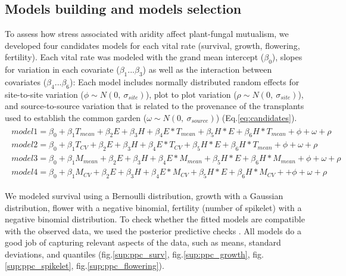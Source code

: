 \documentclass[11pt]{article}
\begin{document}
\subsection*{Models building and models selection}
To assess how stress associated with aridity  affect plant-fungal mutualism, we developed four candidates models for each vital rate (survival, growth, flowering, fertility). 
Each vital rate was modeled with  the  grand mean intercept ($\beta_{0}$), slopes for  variation in each covariate ($\beta_{1}$...$\beta_{3}$) as well as the interaction between covariates ($\beta_{4}$...$\beta_{6}$): 
Each model includes normally distributed random effects for site-to-site  variation ($\phi \sim N(0,\ \sigma_{site})$), plot to plot variation ($\rho \sim N(0,\ \sigma_{site})$), and source-to-source variation that is related to the  provenance of the transplants used to establish the common garden ($\omega \sim N(0,\ \sigma_{source})$) (Eq.\ref{eq:candidates}).
\begin{align}\label{eq:candidates}
\begin{split}
model1 = \beta_{0} + \beta_{1}T_{mean}  + \beta_{2}E + \beta_{3}H + \beta_{4}E*T_{mean} + \beta_{5}H*E +  \beta_{6}H*T_{mean} + \phi + \omega + \rho  \\ 
model2  = \beta_{0} + \beta_{1}T_{CV}  + \beta_{2}E + \beta_{3}H + \beta_{4}E*T_{CV} + \beta_{5}H*E +  \beta_{6}H*T_{mean} +  \phi + \omega + \rho  \\
model3  = \beta_{0} + \beta_{1}M_{mean}  + \beta_{2}E + \beta_{3}H + \beta_{4}E*M_{mean} + \beta_{5}H*E +  \beta_{6}H*M_{mean} + \phi + \omega + \rho \\
model4  = \beta_{0} + \beta_{1}M_{CV}  + \beta_{2}E + \beta_{3}H + \beta_{4}E*M_{CV} + \beta_{5}H*E +  \beta_{6}H*M_{CV} ++ \phi + \omega + \rho 
\end{split}
\end{align}
 
We modeled survival using a  Bernoulli distribution, growth with a Gaussian distribution, flower with a negative binomial,  fertility (number of spikelet) with a negative binomial distribution.
To check whether the fitted models are  compatible with the observed data, we used the posterior predictive checks \citep{gelman2000diagnostic,berkhof2000posterior}. 
All models  do a good job of capturing relevant aspects of the data, such as means, standard deviations, and quantiles (fig.\ref{sup:ppc_surv}, fig.\ref{sup:ppc_growth}, fig.\ref{sup:ppc_spikelet}, fig.\ref{sup:ppc_flowering}).
\end{document}

